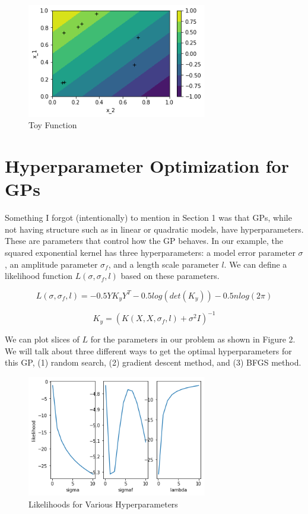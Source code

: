 \documentclass[12pt]{article}
\begin{document}
\begin{figure}
\centering
\includegraphics[width=0.7\textwidth]{Post_2_fcontour}
\caption{Toy Function}
\end{figure}

\section{Hyperparameter Optimization for GPs}

Something I forgot (intentionally) to mention in Section 1 was that GPs, while not having structure such as in linear or quadratic models, have hyperparameters. These are parameters that control how the GP behaves. In our example, the squared exponential kernel has three hyperparameters: a model error parameter $\sigma$, an amplitude parameter $\sigma_{f}$, and a length scale parameter $l$. We can define a likelihood function $L(\sigma,\sigma_{f},l)$ based on these parameters.

\begin{equation}
L(\sigma,\sigma_{f},l) = -0.5YK_{y}Y^{T} - 0.5log(det(K_{y}))-0.5nlog(2\pi)
\end{equation}

\begin{equation}
K_{y} = (K(X,X,\sigma_{f},l)+\sigma^{2}I)^{-1}
\end{equation}

We can plot slices of $L$ for the parameters in our problem as shown in Figure 2. We will talk about three different ways to get the optimal hyperparameters for this GP, (1) random search, (2) gradient descent method, and (3) BFGS method.

\begin{figure}
\centering
\includegraphics[width=0.7\textwidth]{Post_2_hyperresults}
\caption{Likelihoods for Various Hyperparameters}
\end{figure}
\end{document}
